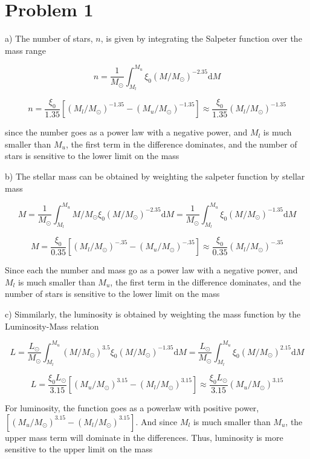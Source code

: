 \documentclass[12pt]{article}
\begin{document}
\section{Problem 1}
a) The number of stars, $n$, is given by integrating the Salpeter function over the mass range

$$ n = \frac{1}{M_{\odot}} \int^{M_{u}}_{M_{l}} \xi_{0} (M/M_{\odot})^{-2.35} \mathrm{d}M $$

$$ n = \frac{\xi_{0}}{1.35} [(M_{l}/M_{\odot})^{-1.35} - (M_{u}/M_{\odot})^{-1.35}] \approx \frac{\xi_{0}}{1.35} (M_{l}/M_{\odot})^{-1.35} $$

since the number goes as a power law with a negative power, and $M_{l}$ is much smaller than $M_{u}$, the first term in the difference dominates, and the number of stars is sensitive to the lower limit on the mass

b) The stellar mass can be obtained by weighting the salpeter function by stellar mass

$$ M = \frac{1}{M_{\odot}} \int^{M_{u}}_{M_{l}} M/M_{\odot} \xi_{0} (M/M_{\odot})^{-2.35} \mathrm{d}M = \frac{1}{M_{\odot}} \int^{M_{u}}_{M_{l}} \xi_{0} (M/M_{\odot})^{-1.35} \mathrm{d}M $$

$$ M = \frac{\xi_{0}}{0.35} [(M_{l}/M_{\odot})^{-.35} - (M_{u}/M_{\odot})^{-.35}]  \approx \frac{\xi_{0}}{0.35} (M_{l}/M_{\odot})^{-.35}$$

Since each the number and mass go as a power law with a negative power, and $M_{l}$ is much smaller than $M_{u}$, the first term in the difference dominates, and the number of stars is sensitive to the lower limit on the mass

c) Simmilarly, the luminosity is obtained by weighting the mass function by the Luminosity-Mass relation

$$ L = \frac{L_{\odot}}{M_{\odot}} \int^{M_{u}}_{M_{l}} (M/M_{\odot})^{3.5} \xi_{0} (M/M_{\odot})^{-1.35} \mathrm{d}M = \frac{L_{\odot}}{M_{\odot}} \int^{M_{u}}_{M_{l}} \xi_{0} (M/M_{\odot})^{2.15} \mathrm{d}M $$

$$ L = \frac{\xi_{0} L_{\odot}}{3.15} [(M_{u}/M_{\odot})^{3.15} - (M_{l}/M_{\odot})^{3.15}] \approx  \frac{\xi_{0} L_{\odot}}{3.15} (M_{u}/M_{\odot})^{3.15}$$

For luminosity, the function goes as a powerlaw with positive power, $[(M_{u}/M_{\odot})^{3.15} - (M_{l}/M_{\odot})^{3.15}]$. And since $M_{l}$ is much smaller than $M_{u}$, the upper mass term will dominate in the differences. Thus, luminosity is more sensitive to the upper limit on the mass
\end{document}
